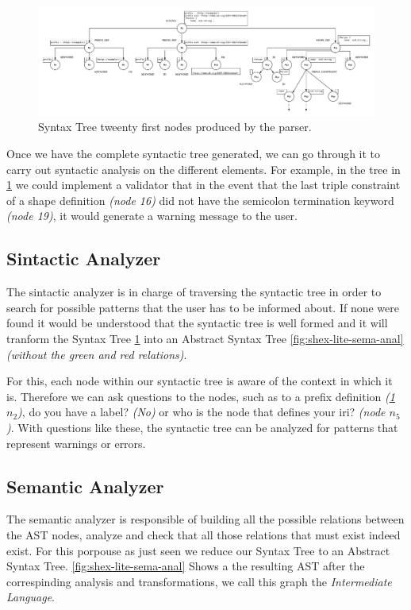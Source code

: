 \begin{figure}
    \includegraphics[width=\textwidth]{images/shex-lite-syntax-tree.pdf}
    \centering
    \caption[Syntax Tree tweenty first nodes produced by the parser]{Syntax Tree tweenty first nodes produced by the parser.}
    \label{fig:shex-lite-st}
\end{figure}

Once we have the complete syntactic tree generated, we can go through it to carry out syntactic analysis on the different elements.
For example, in the tree in \cref{fig:shex-lite-st} we could implement a validator that in the event that the last triple constraint
of a shape definition \textit{(node 16)} did not have the semicolon termination keyword \textit{(node 19)}, it would generate a
warning message to the user.

\subsection{Sintactic Analyzer}
The sintactic analyzer is in charge of traversing the syntactic tree in order to search for possible patterns that the user has to
be informed about. If none were found it would be understood that the syntactic tree is well formed and it will tranform the Syntax Tree
\cref{fig:shex-lite-st} into an Abstract Syntax Tree \cref{fig:shex-lite-sema-anal} \textit{(without the green and red relations)}.

For this, each node within our syntactic tree is aware of the context in which it is. Therefore we can ask questions to the nodes,
such as to a prefix definition \textit{(\cref{fig:shex-lite-st} $n_2$)}, do you have a label? \textit{(No)} or who is the node
that defines your iri? \textit{(node $n_5$)}. With questions like these, the syntactic tree can be analyzed for patterns that
represent warnings or errors.

\subsection{Semantic Analyzer}
The semantic analyzer is responsible of building all the possible relations between the AST nodes, analyze and check that
all those relations that must exist indeed exist. For this porpouse as just seen we reduce our Syntax Tree to an
Abstract Syntax Tree. \cref{fig:shex-lite-sema-anal} Shows a the resulting AST after the correspinding analysis and
transformations, we call this graph the \textit{Intermediate Language}.

